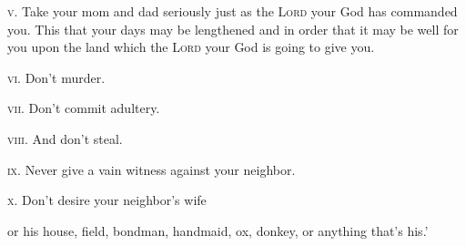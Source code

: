 \begin{inparaenum}
   \textsc{v.} Take your mom and dad seriously just as the \textsc{Lord} your God has commanded you. This that your days may be lengthened and in order that it may be well for you upon the land which the \textsc{Lord} your God is going to give you.%
  
   \textsc{vi.} Don't murder.%
  
   \textsc{vii.} Don't commit adultery.%
  
   \textsc{viii.} And don't steal.%
  
   \textsc{ix.} Never give a vain witness against your neighbor.%
  
   \textsc{x.} Don't desire your neighbor's wife
  
  or his house, field, bondman, handmaid, ox, donkey, or anything that's his.'%
  

\end{inparaenum}
